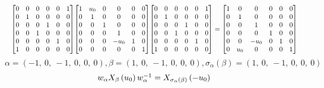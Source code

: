 \documentclass[11pt]{article}
\theoremstyle{definition}
\begin{document}
\[
\scaletoalign{\textwidth}{{\left[\begin{matrix}0 & 0 & 0 & 0 & 0 & 1\\0 & 1 & 0 & 0 & 0 & 0\\0 & 0 & 0 & 1 & 0 & 0\\0 & 0 & 1 & 0 & 0 & 0\\0 & 0 & 0 & 0 & 1 & 0\\1 & 0 & 0 & 0 & 0 & 0\end{matrix}\right]} {\left[\begin{matrix}1 & u_{0} & 0 & 0 & 0 & 0\\0 & 1 & 0 & 0 & 0 & 0\\0 & 0 & 1 & 0 & 0 & 0\\0 & 0 & 0 & 1 & 0 & 0\\0 & 0 & 0 & - u_{0} & 1 & 0\\0 & 0 & 0 & 0 & 0 & 1\end{matrix}\right]} {\left[\begin{matrix}0 & 0 & 0 & 0 & 0 & 1\\0 & 1 & 0 & 0 & 0 & 0\\0 & 0 & 0 & 1 & 0 & 0\\0 & 0 & 1 & 0 & 0 & 0\\0 & 0 & 0 & 0 & 1 & 0\\1 & 0 & 0 & 0 & 0 & 0\end{matrix}\right]} = {\left[\begin{matrix}1 & 0 & 0 & 0 & 0 & 0\\0 & 1 & 0 & 0 & 0 & 0\\0 & 0 & 1 & 0 & 0 & 0\\0 & 0 & 0 & 1 & 0 & 0\\0 & 0 & - u_{0} & 0 & 1 & 0\\0 & u_{0} & 0 & 0 & 0 & 1\end{matrix}\right]}}
\]
\[
\alpha = \left( -1, \  0, \  -1, \  0, \  0, \  0\right), \beta = \left( 1, \  0, \  -1, \  0, \  0, \  0\right), \sigma_{\alpha}(\beta) = \left( 1, \  0, \  -1, \  0, \  0, \  0\right)
\]
\[
\scaletoalign{\textwidth}{w_{\alpha} X_{\beta}\left(u_{0}\right) w_{\alpha}^{-1} = X_{\sigma_{\alpha}\left(\beta\right)}\left(- u_{0}\right)}
\]
\end{document}
